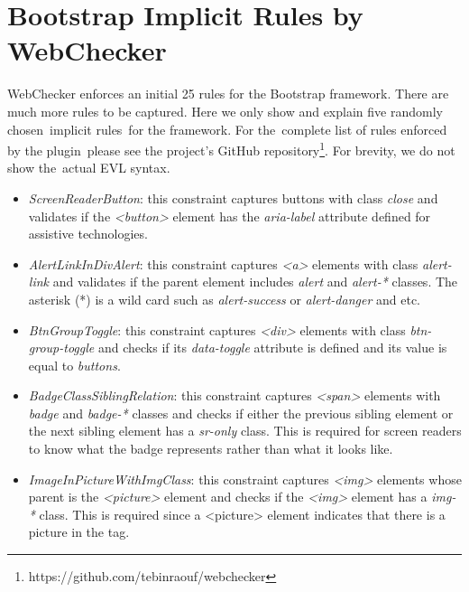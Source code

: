 \documentclass[conference]{IEEETran}
\begin{document}
\section{Bootstrap Implicit Rules by WebChecker}
WebChecker enforces an initial 25 rules for the Bootstrap framework. There are much more rules to be captured. Here we only show and explain five randomly chosen implicit rules for the framework. For the complete list of rules enforced by the plugin please see the project's GitHub repository\footnote{https://github.com/tebinraouf/webchecker}. For brevity, we do not show the actual EVL syntax.
  
  
\begin{itemize}
\item \textit{ScreenReaderButton}: this constraint captures buttons with class \textit{close} and validates if the \textit{<button>} element has the \textit{aria-label} attribute defined for assistive technologies.
\item \textit{AlertLinkInDivAlert}: this constraint captures \textit{<a>} elements with class \textit{alert-link} and validates if the parent element includes \textit{alert} and \textit{alert-*} classes. The asterisk (*) is a wild card such as \textit{alert-success} or \textit{alert-danger} and etc.
\item \textit{BtnGroupToggle}: this constraint captures \textit{<div>} elements with class \textit{btn-group-toggle} and checks if its \textit{data-toggle} attribute is defined and its value is equal to \textit{buttons}.
\item \textit{BadgeClassSiblingRelation}: this constraint captures \textit{<span>} elements with \textit{badge} and \textit{badge-*} classes and checks if either the previous sibling element or the next sibling element has a \textit{sr-only} class. This is required for screen readers to know what the badge represents rather than what it looks like.
\item \textit{ImageInPictureWithImgClass}: this constraint captures  \textit{<img>} elements whose parent is the  \textit{<picture>} element and checks if the \textit{<img>} element has a \textit{img-*} class. This is required since a <picture> element indicates that there is a picture in the tag.
\end{itemize}
\end{document}
